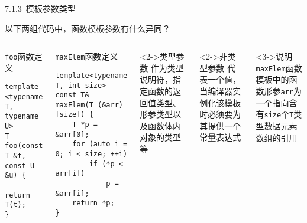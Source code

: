 \begin{frame}[fragile]{7.1.3~模板参数类型}

以下两组代码中，函数\alert{模板参数}有什么异同？

\vspace{-4mm}

\begin{columns}[t]
\begin{blueblock}{\texttt{foo}函数定义}
\begin{lstlisting}[moreemph={T,U}]
template <typename T, typename U>
T foo(const T &t, const U &u) {
    return T(t);
}
\end{lstlisting}
\end{blueblock}
\begin{blueblock}{\texttt{maxElem}函数定义}
\begin{lstlisting}[moreemph={T}]
template<typename T, int size>
const T& maxElem(T (&arr)[size]) {
    T *p = &arr[0];
    for (auto i = 0; i < size; ++i)
        if (*p < arr[i])
            p = &arr[i];
    return *p;
}
\end{lstlisting}
\end{blueblock}


\begin{block}<2->{类型参数}
作为\alert{类型说明符}，指定函数的返回值类型、形参类型以及函数体内对象的类型等
\end{block}
\begin{block}<2->{非类型参数}
代表一个值，当编译器实例化该模板时必须要为其提供一个\alert{常量}表达式
\end{block}
\begin{yellowblock}<3->{说明}
\texttt{maxElem}函数模板中的函数形参\texttt{arr}为一个指向含有\texttt{size}个\texttt{T}类型数据元素数组的引用
\end{yellowblock}
\end{columns}

\end{frame}


